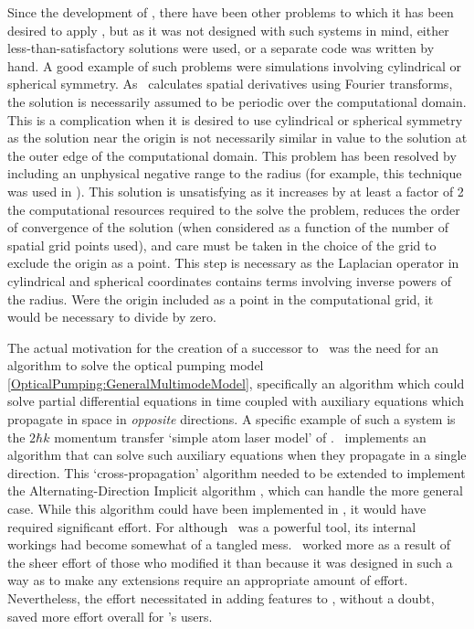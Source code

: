 Since the development of \XMDS, there have been other problems to which it has been desired to apply \XMDS, but as it was not designed with such systems in mind, either less-than-satisfactory solutions were used, or a separate code was written by hand.  A good example of such problems were simulations involving cylindrical or spherical symmetry.  As \XMDS\ calculates spatial derivatives using Fourier transforms, the solution is necessarily assumed to be periodic over the computational domain.  This is a complication when it is desired to use cylindrical or spherical symmetry as the solution near the origin is not necessarily similar in value to the solution at the outer edge of the computational domain.  This problem has been resolved by including an unphysical negative range to the radius (for example, this technique was used in \citep{Wuster:2005,Dall:2009}).  This solution is unsatisfying as it increases by at least a factor of 2 the computational resources required to the solve the problem, reduces the order of convergence of the solution (when considered as a function of the number of spatial grid points used), and care must be taken in the choice of the grid to exclude the origin as a point.  This step is necessary as the Laplacian operator in cylindrical and spherical coordinates contains terms involving inverse powers of the radius.  Were the origin included as a point in the computational grid, it would be necessary to divide by zero.

The actual motivation for the creation of a successor to \XMDS\ was the need for an algorithm to solve the optical pumping model \eqref{OpticalPumping:GeneralMultimodeModel}, specifically an algorithm which could solve partial differential equations in time coupled with auxiliary equations which propagate in space in \emph{opposite} directions.  A specific example of such a system is the $2 \hbar k$ momentum transfer `simple atom laser model' of .  \XMDS\ implements an algorithm that can solve such auxiliary equations when they propagate in a single direction.  This `cross-propagation' algorithm needed to be extended to implement the Alternating-Direction Implicit algorithm \citep{NumericalRecipes}, which can handle the more general case.  While this algorithm could have been implemented in \XMDS, it would have required significant effort.  For although \XMDS\ was a powerful tool, its internal workings had become somewhat of a tangled mess.  \XMDS\ worked more as a result of the sheer effort of those who modified it than because it was designed in such a way as to make any extensions require an appropriate amount of effort.  Nevertheless, the effort necessitated in adding features to \XMDS, without a doubt, saved more effort overall for \XMDS's users.  


